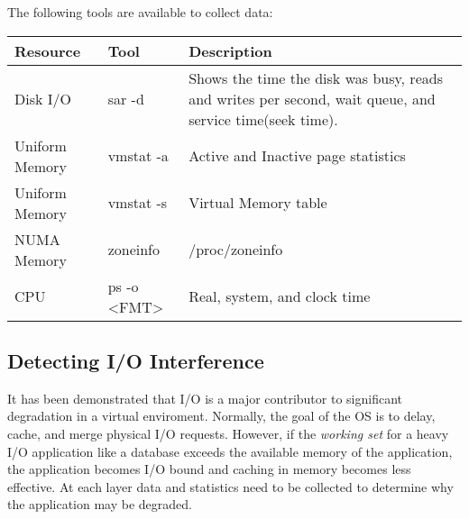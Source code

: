 \newline 
The following tools are available to collect data:
\begin{tabular}{ l l p{5cm} }
  Resource & Tool & Description \\
  \hline
  Disk I/O & sar -d & Shows the time the disk was busy, reads and writes per second, wait queue, and service time(seek time). \\
  Uniform Memory & vmstat -a & Active and Inactive page statistics \\
  Uniform Memory & vmstat -s & Virtual Memory table \\
  NUMA Memory & zoneinfo & /proc/zoneinfo \\
  CPU & ps -o <FMT> & Real, system, and clock time \\
\end{tabular}

\begin{comment}
       To see every process with a user-defined format:
          ps -eo pid,tid,class,rtprio,ni,pri,psr,pcpu,stat,wchan:14,comm
          ps axo stat,euid,ruid,tty,tpgid,sess,pgrp,ppid,pid,pcpu,comm
          ps -eo pid,tt,user,fname,tmout,f,wchan

PROCESS STATE CODES
       Here are the different values that the s, stat and state output
       specifiers (header "STAT" or "S") will display to describe the state of
       a process:
       D    uninterruptible sleep (usually IO)
       R    running or runnable (on run queue)
       S    interruptible sleep (waiting for an event to complete)
       T    stopped, either by a job control signal or because it is being
            traced.
       W    paging (not valid since the 2.6.xx kernel)
       X    dead (should never be seen)
       Z    defunct ("zombie") process, terminated but not reaped by its
            parent.
      For BSD formats and when the stat keyword is used, additional
       characters may be displayed:
       <    high-priority (not nice to other users)
       N    low-priority (nice to other users)
       L    has pages locked into memory (for real-time and custom IO)
       s    is a session leader
       l    is multi-threaded (using CLONE_THREAD, like NPTL pthreads do)
       +    is in the foreground process group.
\end{comment}

\subsection{Detecting I/O Interference}
It has been demonstrated that I/O is a major contributor to significant degradation in a virtual enviroment.  Normally, the goal of the OS is to delay, cache, and merge physical I/O requests.  However, if the \emph{working set} for a heavy I/O application like a database exceeds the available memory of the application, the application becomes I/O bound and caching in memory becomes less effective.
At each layer data and statistics need to be collected to determine why the application may be degraded.
\newline

